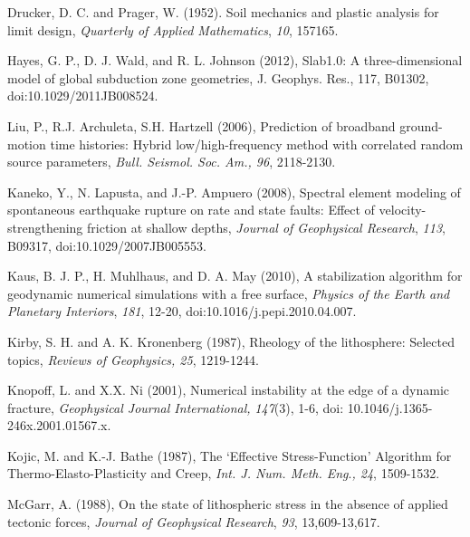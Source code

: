 \documentclass{pylithdoc}
\begin{document}
\begin{thebibliography}{Bibliography}
Drucker, D.
  C. and Prager, W. (1952). Soil mechanics and plastic analysis for
  limit design, \textit{Quarterly of Applied Mathematics},
  \textit{10}, 157\textendash{}165.

Hayes, G. P., D. J. Wald,
  and R. L. Johnson (2012), Slab1.0: A three-dimensional model of
  global subduction zone geometries, J. Geophys. Res., 117, B01302,
  doi:10.1029/2011JB008524.

Liu, P., R.J. Archuleta,
  S.H. Hartzell (2006), Prediction of broadband ground-motion time
  histories: Hybrid low/high-frequency method with correlated random
  source parameters, \textit{Bull. Seismol. Soc. Am., 96}, 2118-2130.

Kaneko, Y., N. Lapusta,
  and J.-P. Ampuero (2008), Spectral element modeling of spontaneous
  earthquake rupture on rate and state faults: Effect of
  velocity-strengthening friction at shallow depths, \textit{Journal
    of Geophysical Research},\textit{ 113}, B09317,
  doi:10.1029/2007JB005553.

Kaus, B. J. P.,
  H. Muhlhaus, and D. A. May (2010), A stabilization algorithm for
  geodynamic numerical simulations with a free surface,
  \textit{Physics of the Earth and Planetary Interiors}, \textit{181},
  12-20, doi:10.1016/j.pepi.2010.04.007.

Kirby,
  S. H. and A. K. Kronenberg (1987), Rheology of the lithosphere:
  Selected topics, \textit{Reviews of Geophysics, 25}, 1219-1244.

Knopoff, L. and X.X.
  Ni (2001), Numerical instability at the edge of a dynamic fracture,
  \emph{Geophysical Journal International,}\textit{\emph{
  }}\textit{147}(3), 1-6, doi: 10.1046/j.1365-246x.2001.01567.x.

Kojic, M. and K.-J.
  Bathe (1987), The `Effective Stress-Function' Algorithm for
  Thermo-Elasto-Plasticity and Creep,
  \emph{Int. J. Num. Meth. Eng}.\emph{, 24}, 1509-1532.

McGarr, A. (1988), On the state of
  lithospheric stress in the absence of applied tectonic forces,
  \textit{Journal of Geophysical Research}, \textit{93},
  13,609-13,617.


\end{thebibliography}
\end{document}
